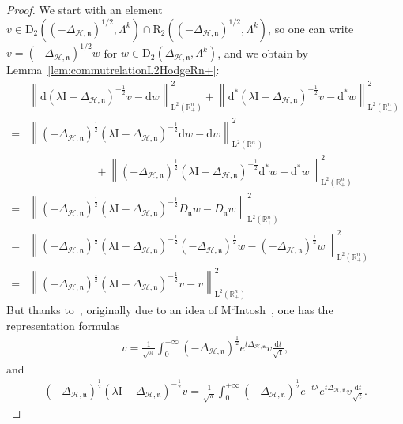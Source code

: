 \documentclass[AHL,Unicode,longabstracts,published]{cedram}
\newcommand{\bbR}{\mathbb{R}}
\newcommand{\rmd}{\mathrm{d}}
\newcommand{\rmD}{\mathrm{D}}
\newcommand{\rmL}{\mathrm{L}}
\newcommand{\rmR}{\mathrm{R}}
\newcommand{\rmI}{\mathrm{I}}
\newcommand{\clH}{\mathcal{H}}
\newcommand{\fkn}{\mathfrak{n}}
\begin{document}
\begin{proof}
We start with an element $v\in\rmD_2((-\Delta_{\clH,\fkn})^{1/2},\Lambda^k)\cap\rmR _2((-\Delta_{\clH,\fkn})^{1/2},\Lambda^k)$, so one can write $v=(-\Delta_{\clH,\fkn})^{1/2}w$ for $w\in\rmD_2(\Delta_{\clH,\fkn},\Lambda^k)$, and we obtain by Lemma~\ref{lem:commutrelationL2HodgeRn+}:
\begin{align*}
&\left\| \rmd\left(\lambda\rmI -\Delta_{\clH,\fkn}\right)^{-\frac{1}{2}} v -\rmd w\right\|_{\rmL^2\left(\bbR^n_+\right)}^2+\left\| \rmd^\ast\left(\lambda\rmI -\Delta_{\clH,\fkn}\right)^{-\frac{1}{2}} v -\rmd^\ast w\right\|_{\rmL^2\left(\bbR^n_+\right)}^2\\
= & \left\| \left(-\Delta_{\clH,\fkn}\right)^{\frac{1}{2}}\left(\lambda\rmI -\Delta_{\clH,\fkn}\right)^{-\frac{1}{2}} \rmd w -\rmd w\right\|_{\rmL^2\left(\bbR^n_+\right)}^2 \\
&\qquad\qquad\qquad+ \left\| \left(-\Delta_{\clH,\fkn}\right)^{\frac{1}{2}}\left(\lambda\rmI -\Delta_{\clH,\fkn}\right)^{-\frac{1}{2}} \rmd^\ast w -\rmd^\ast w\right\|_{\rmL^2\left(\bbR^n_+\right)}^2\\
= & \left\| \left(-\Delta_{\clH,\fkn}\right)^{\frac{1}{2}}\left(\lambda\rmI -\Delta_{\clH,\fkn}\right)^{-\frac{1}{2}} D_\fkn w -D_\fkn w\right\|_{\rmL^2\left(\bbR^n_+\right)}^2 \\
= & \left\| \left(-\Delta_{\clH,\fkn}\right)^{\frac{1}{2}}\left(\lambda\rmI -\Delta_{\clH,\fkn}\right)^{-\frac{1}{2}} \left(-\Delta_{\clH,\fkn}\right)^{\frac{1}{2}} w -\left(-\Delta_{\clH,\fkn}\right)^{\frac{1}{2}}w\right\|_{\rmL^2\left(\bbR^n_+\right)}^2\\
= & \left\| \left(-\Delta_{\clH,\fkn}\right)^{\frac{1}{2}}\left(\lambda\rmI -\Delta_{\clH,\fkn}\right)^{-\frac{1}{2}} v -v\right\|_{\rmL^2\left(\bbR^n_+\right)}^2
\end{align*}
But thanks to~\cite[Theorem~5.2.6]{bookHaase2006}, originally due to an idea of $\text{M}^{\text{c}}$Intosh~\cite{McIntosh1986}, one has the representation formulas
\begin{align*}
v= \frac{1}{\sqrt{\pi}}\int_{0}^{+\infty} \left(-\Delta_{\clH,\fkn}\right)^{\frac{1}{2}}e^{t\Delta_{\clH,\fkn}} v\frac{\rmd t}{\sqrt{t}},
\end{align*}
and
\begin{align*}
\left(-\Delta_{\clH,\fkn}\right)^{\frac{1}{2}}\left(\lambda\rmI -\Delta_{\clH,\fkn}\right)^{-\frac{1}{2}}v= \frac{1}{\sqrt{\pi}}\int_{0}^{+\infty}
\left(-\Delta_{\clH,\fkn}\right)^{\frac{1}{2}}e^{-t\lambda}e^{t\Delta_{\clH,\fkn}} v\frac{\rmd t}{\sqrt{t}}.
\end{align*}

\end{proof}
\end{document}
